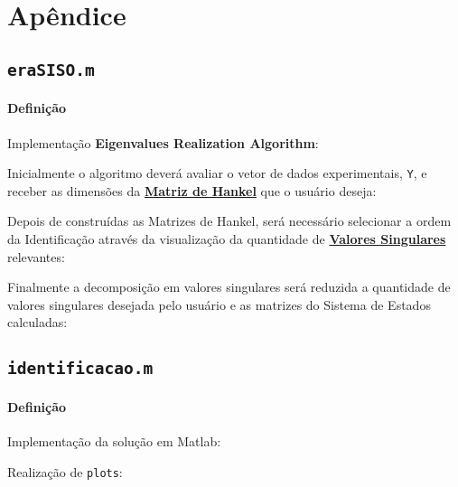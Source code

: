 \documentclass{article}
\begin{document}
\appendix
\section{Apêndice}
\subsection{\texttt{eraSISO.m}}\label{append.ERA}
    \paragraph{Definição}Implementação \textbf{Eigenvalues Realization Algorithm}:

    \begin{resolution}
        Inicialmente o algoritmo deverá avaliar o vetor de dados experimentais, \texttt{Y}, e receber as dimensões da \href{https://en.wikipedia.org/wiki/Hankel_matrix}{\textbf{Matriz de Hankel}} que o usuário deseja:
        \begin{scriptsize}
            \myOctave
        \end{scriptsize}
\newpage
        Depois de construídas as Matrizes de Hankel, será necessário selecionar a ordem da Identificação através da visualização da quantidade de \href{https://en.wikipedia.org/wiki/Singular_value}{\textbf{Valores Singulares}} relevantes:
        \begin{scriptsize}
            \myOctave
        \end{scriptsize}
        \newpage
        Finalmente a decomposição em valores singulares será reduzida a quantidade de valores singulares desejada pelo usuário e as matrizes do Sistema de Estados calculadas:
        \begin{scriptsize}
            \myOctave
        \end{scriptsize}
    \end{resolution}
\newpage

\subsection{\texttt{identificacao.m}}\label{append.ide}
    \paragraph{Definição}Implementação da solução em Matlab:
        \begin{resolution}
            Realização de \texttt{plots}:
            \begin{scriptsize}
                \myOctave
            \end{scriptsize}
        \end{resolution}
\end{document}
